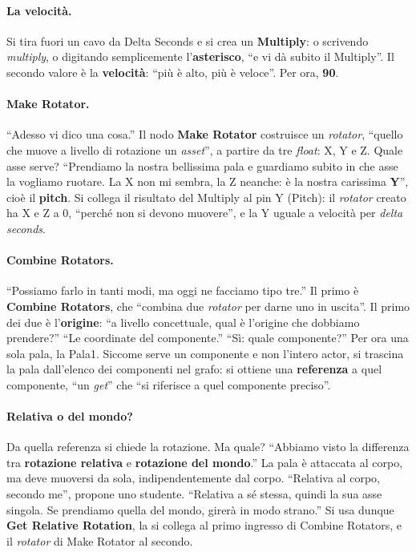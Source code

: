 \paragraph{La velocità.} Si tira fuori un cavo da Delta Seconds e si crea un
\textbf{Multiply}: o scrivendo \emph{multiply}, o digitando semplicemente
l'\textbf{asterisco}, ``e vi dà subito il Multiply''. Il secondo valore è la
\textbf{velocità}: ``più è alto, più è veloce''. Per ora, \textbf{90}.

\paragraph{Make Rotator.} ``Adesso vi dico una cosa.'' Il nodo \textbf{Make Rotator}
costruisce un \emph{rotator}, ``quello che muove a livello di rotazione un
\emph{asset}'', a partire da tre \emph{float}: X, Y e Z. Quale asse serve? ``Prendiamo
la nostra bellissima pala e guardiamo subito in che asse la vogliamo ruotare. La X non
mi sembra, la Z neanche: è la nostra carissima \textbf{Y}'', cioè il \textbf{pitch}.
Si collega il risultato del Multiply al pin Y (Pitch): il \emph{rotator} creato ha X e
Z a 0, ``perché non si devono muovere'', e la Y uguale a velocità per \emph{delta
seconds}.

\paragraph{Combine Rotators.} ``Possiamo farlo in tanti modi, ma oggi ne facciamo tipo
tre.'' Il primo è \textbf{Combine Rotators}, che ``combina due \emph{rotator} per
darne uno in uscita''. Il primo dei due è l'\textbf{origine}: ``a livello concettuale,
qual è l'origine che dobbiamo prendere?'' ``Le coordinate del componente.'' ``Sì:
quale componente?'' Per ora una sola pala, la Pala1. Siccome serve un componente e non
l'intero actor, si trascina la pala dall'elenco dei componenti nel grafo: si ottiene
una \textbf{referenza} a quel componente, ``un \emph{get}'' che ``si riferisce a quel
componente preciso''.

\paragraph{Relativa o del mondo?} Da quella referenza si chiede la rotazione. Ma quale?
``Abbiamo visto la differenza tra \textbf{rotazione relativa} e \textbf{rotazione del
mondo}.'' La pala è attaccata al corpo, ma deve muoversi da sola, indipendentemente dal
corpo. ``Relativa al corpo, secondo me'', propone uno studente. ``Relativa a sé
stessa, quindi la sua asse singola. Se prendiamo quella del mondo, girerà in modo
strano.'' Si usa dunque \textbf{Get Relative Rotation}, la si collega al primo
ingresso di Combine Rotators, e il \emph{rotator} di Make Rotator al secondo.

